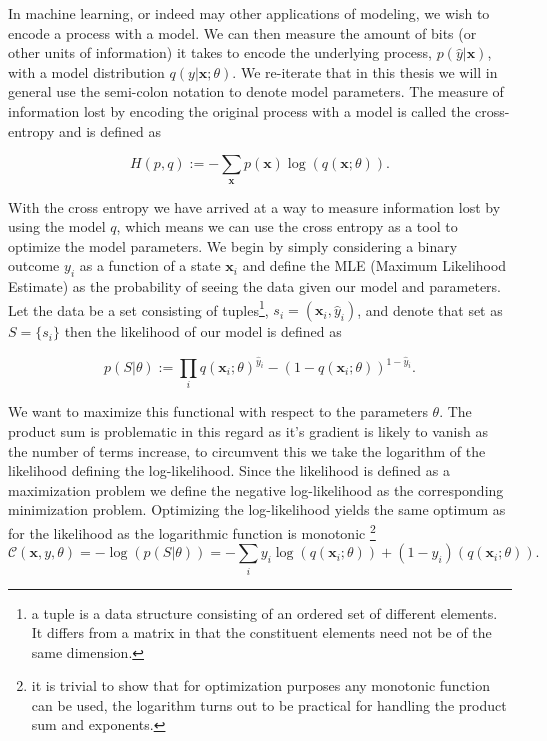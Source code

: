 In machine learning, or indeed may other applications of modeling, we wish to encode a process with a model. We can then measure the amount of bits (or other units of information) it takes to encode the underlying process, $p(\hat{y} | \mathbf{x})$, with a model distribution $q(y| \mathbf{x}; \theta)$. We re-iterate that in this thesis we will in general use the semi-colon notation to denote model parameters. The measure of information lost by encoding the original process with a model is called the cross-entropy and is defined as

\begin{equation}
H(p, q) := - \sum_\mathbf{x} p(\mathbf{x})\log(q(\mathbf{x}; \theta)).
\end{equation}

\noindent With the cross entropy we have arrived at a way to measure information lost by using the model $q$, which means we can use the cross entropy as a tool to optimize the model parameters. We begin by simply considering a binary outcome $y_i$ as a function of a state $\mathbf{x}_i$ and define the MLE (Maximum Likelihood Estimate) as the probability of seeing the data given our model and parameters. Let the data be a set consisting of tuples\footnote{a tuple is a data structure consisting of an ordered set of different elements. It differs from a matrix in that the constituent elements need not be of the same dimension.}, $s_i = (\mathbf{x}_i, \hat{y}_i)$, and denote that set as $S = \{s_i\}$ then the likelihood of our model is defined as 

\begin{equation}\label{eq:likelihood}
p(S | \theta) := \prod_i q(\mathbf{x}_i; \theta)^{\hat{y}_i} - (1-q(\mathbf{x}_i; \theta))^{1-\hat{y}_i}.
\end{equation}

\noindent We want to maximize this functional with respect to the parameters $\theta$. The product sum is problematic in this regard as it's gradient is likely to vanish as the number of terms increase, to circumvent this we take the logarithm of the likelihood defining the log-likelihood. Since the likelihood is defined as a maximization problem we define the negative log-likelihood as the corresponding minimization problem. Optimizing the log-likelihood yields the same optimum as for the likelihood as the logarithmic function is monotonic \footnote{it is trivial to show that for optimization purposes any monotonic function can be used, the logarithm turns out to be practical for handling the product sum and exponents.}
\begin{equation}\label{eq:mle}
\mathcal{C}(\mathbf{x}, y, \theta) = -\log(p(S | \theta)) = -\sum_i y_i\log(q(\mathbf{x}_i; \theta)) + (1-y_i)(q(\mathbf{x}_i; \theta)).
\end{equation}

